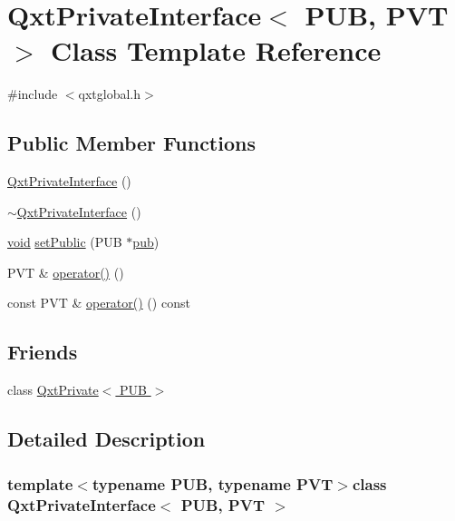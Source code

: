 \hypertarget{class_qxt_private_interface}{\section{Qxt\-Private\-Interface$<$ P\-U\-B, P\-V\-T $>$ Class Template Reference}
\label{class_qxt_private_interface}
}


{\ttfamily \#include $<$qxtglobal.\-h$>$}

\subsection*{Public Member Functions}
\begin{DoxyCompactItemize}
\item 
\hyperlink{class_qxt_private_interface_afbfb70825d95ae9f6f21c8f28eb0031c}{Qxt\-Private\-Interface} ()
\item 
\hyperlink{class_qxt_private_interface_a0102fe4e9e69930dcc1f09cac7dd312b}{$\sim$\-Qxt\-Private\-Interface} ()
\item 
\hyperlink{group___u_a_v_objects_plugin_ga444cf2ff3f0ecbe028adce838d373f5c}{void} \hyperlink{class_qxt_private_interface_a0aff7846be88207523a4f1993057c93b}{set\-Public} (P\-U\-B $\ast$\hyperlink{qxtdiscoverableservice_8cpp_a6562f7cbc155fc4ed8d142210e12717b}{pub})
\item 
P\-V\-T \& \hyperlink{class_qxt_private_interface_a4047480d9423001a9668fd417476bcbb}{operator()} ()
\item 
const P\-V\-T \& \hyperlink{class_qxt_private_interface_aea3907b84f6fb968b2c0cdb1d19188be}{operator()} () const 
\end{DoxyCompactItemize}
\subsection*{Friends}
\begin{DoxyCompactItemize}
\item 
class \hyperlink{class_qxt_private_interface_a1a9e74afa6faa815c02bc2f184b21c68}{Qxt\-Private$<$ P\-U\-B $>$}
\end{DoxyCompactItemize}


\subsection{Detailed Description}
\subsubsection*{template$<$typename P\-U\-B, typename P\-V\-T$>$class Qxt\-Private\-Interface$<$ P\-U\-B, P\-V\-T $>$}



